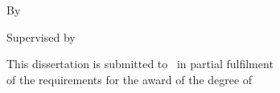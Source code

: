\thispagestyle{empty}
\begin{center}
\vspace*{1.2cm}

{\LARGE\bfseries\thesisTitle\par}

\vspace{2.2cm}

{\large By\par}
\vspace{0.4cm}
{\large\bfseries\authorName\par}
{\large\authorIndexNo\par}

\vspace{2.2cm}

{\large Supervised by\par}
\vspace{0.4cm}
{\large\bfseries\supervisorName\par}
{\large\supervisorTitle\par}

\vspace{2.4cm}

{\large
This dissertation is submitted to \universityName\ in partial fulfilment\\
of the requirements for the award of the degree of\\[0.4cm]
\bfseries\degreeName\par}

\vfill

{\large\departmentName\par}
{\large\facultyName\par}
{\large\universityName\par}
\vspace{0.6cm}
{\large\submissionMonthYear\par}

\vspace{1.2cm}
\end{center}
\clearpage
